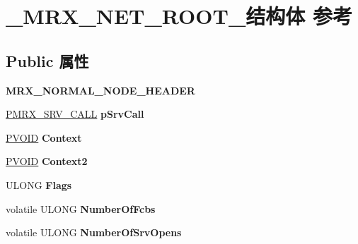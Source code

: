 \hypertarget{struct___m_r_x___n_e_t___r_o_o_t__}{}\section{\+\_\+\+M\+R\+X\+\_\+\+N\+E\+T\+\_\+\+R\+O\+O\+T\+\_\+结构体 参考}
\label{struct___m_r_x___n_e_t___r_o_o_t__}
\subsection*{Public 属性}
\begin{DoxyCompactItemize}
\item 
\mbox{\label{struct___m_r_x___n_e_t___r_o_o_t___a95d67e30359321147fba0c53dddce94c}} 
{\bfseries M\+R\+X\+\_\+\+N\+O\+R\+M\+A\+L\+\_\+\+N\+O\+D\+E\+\_\+\+H\+E\+A\+D\+ER}
\item 
\mbox{\label{struct___m_r_x___n_e_t___r_o_o_t___aa871a80ff9ce70e87a46a215c98a727f}} 
\hyperlink{struct___m_r_x___s_r_v___c_a_l_l__}{P\+M\+R\+X\+\_\+\+S\+R\+V\+\_\+\+C\+A\+LL} {\bfseries p\+Srv\+Call}
\item 
\mbox{\label{struct___m_r_x___n_e_t___r_o_o_t___a5b2e0a5509b8c659a3a2f4ffcc5e5a03}} 
\hyperlink{interfacevoid}{P\+V\+O\+ID} {\bfseries Context}
\item 
\mbox{\label{struct___m_r_x___n_e_t___r_o_o_t___a9e8c35a9ca49b79e4417034b3ee5ed96}} 
\hyperlink{interfacevoid}{P\+V\+O\+ID} {\bfseries Context2}
\item 
\mbox{\label{struct___m_r_x___n_e_t___r_o_o_t___a12c7721a826127164b1760e3edfdf599}} 
U\+L\+O\+NG {\bfseries Flags}
\item 
\mbox{\label{struct___m_r_x___n_e_t___r_o_o_t___a2a95d443b7ee5eea71270ee27b6ee4cc}} 
volatile U\+L\+O\+NG {\bfseries Number\+Of\+Fcbs}
\item 
\mbox{\label{struct___m_r_x___n_e_t___r_o_o_t___a284120be221e50a4539b296d7103bd46}} 
volatile U\+L\+O\+NG {\bfseries Number\+Of\+Srv\+Opens}

\end{DoxyCompactItemize}
